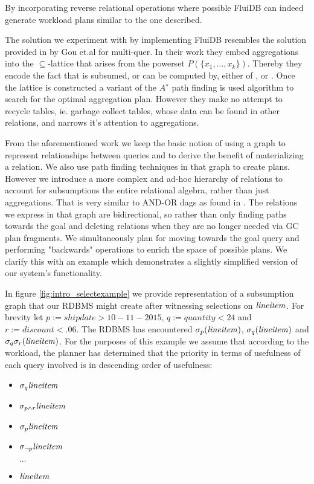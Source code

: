 By incorporating reverse relational operations where possible FluiDB
can indeed generate workload plans similar to the one described.

The solution we experiment with by implementing FluiDB resembles the
solution provided in \cite{gouSupSearchEfficient2006} by Gou et.al for
multi-quer. In their work they embed aggregations  into the \(\subseteq\)-lattice that arises from the powerset
\(P(\{x_1, ..., x_k\})\). Thereby they encode the fact that  is subsumed, or can be computed by, either of ,  or . Once the
lattice is constructed a variant of the \(A^{\star}\) path finding is
used algorithm to search for the optimal aggregation plan. However
they make no attempt to recycle tables, ie. garbage collect tables,
whose data can be found in other relations, and narrows it's attention
to aggregations.

From the aforementioned work we keep the basic notion of using a graph
to represent relationships between queries and to derive the benefit
of materializing a relation. We also use path finding techniques in
that graph to create plans. However we introduce a more complex and
ad-hoc hierarchy of relations to account for subsumptions the entire
relational algebra, rather than just aggregations. That is very
similar to AND-OR dags as found in
\cite{mistryMaterializedViewSelection2001}.  The relations we express
in that graph are bidirectional, so rather than only finding paths
towards the goal and deleting relations when they are no longer needed
via GC plan fragments. We simultaneously plan for moving towards the
goal query and performing "backwards" operations to enrich the space
of possible plans. We clarify this with an example which demonstrates
a slightly simplified version of our system's functionality.

In figure \ref{fig:intro_selectexample} we provide representation of a
subsumption graph that our RDBMS might create after witnessing
selections on \(\mathit{lineitem}\). For brevity let \(p:=shipdate > 10-11-2015\),
\(q:=quantity < 24\) and \(r:=discount < .06\). The RDBMS has
encountered \(\sigma_{p}(\mathit{lineitem})\), \(\sigma_{q}(\mathit{lineitem})\) and
\(\sigma_{q} \sigma_{r} (\mathit{lineitem})\). For the purposes of this example we
assume that according to the workload, the planner has determined that
the priority in terms of usefulness of each query involved is in
descending order of usefulness:

\begin{itemize}
\item \(\sigma_q \mathit{lineitem}\)
\item \(\sigma_{p \land r} \mathit{lineitem}\)
\item \(\sigma_p \mathit{lineitem}\)
\item \(\sigma_{\neg p} \mathit{lineitem}\)
\item[ \( \ldots \)]
\item \(\mathit{lineitem}\)
\end{itemize}


